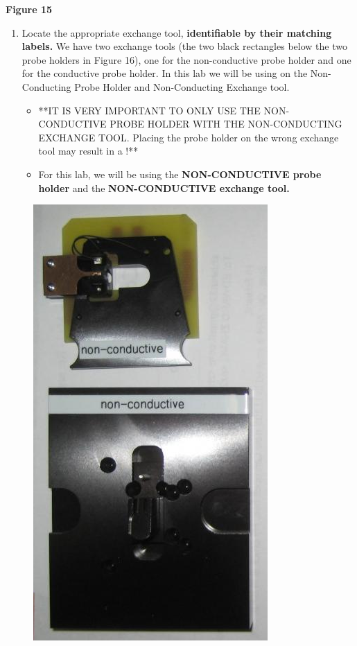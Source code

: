 \documentclass{../lab}
\begin{document}
\textbf{Figure 15}

\begin{enumerate}
    \item Locate the appropriate exchange tool, \textbf{identifiable by their matching labels.} We have two exchange tools (the two black rectangles below the two probe holders in Figure 16), one for the non-conductive probe holder and one for the conductive probe holder.  In this lab we will be using on the Non-Conducting Probe Holder and Non-Conducting Exchange tool.
    \begin{itemize}
        \item **IT IS VERY IMPORTANT TO ONLY USE THE NON-CONDUCTIVE PROBE HOLDER WITH THE NON-CONDUCTING EXCHANGE TOOL.  Placing the probe holder on the wrong exchange tool may result in a \textbf{}!**

        \item For this lab, we will be using the \textbf{NON-CONDUCTIVE probe holder} and the \textbf{NON-CONDUCTIVE exchange tool.}

    \end{itemize}

\end{enumerate}


\begin{figure}[h]
    \centering
    \href{http://dev-physicsadv.pantheon.berkeley.edu/sites/default/files/AFMImages/ProbeHolderExchange.png}{\includegraphics[width=0.5\linewidth]{images/ProbeHolderExchange.png}}
    \caption{}
    \label{fig:ProbeHolderExchange}
\end{figure}
\end{document}
